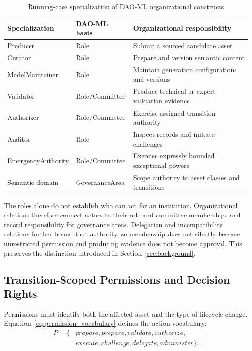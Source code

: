 \documentclass[journal]{IEEEtran}
\begin{document}
\begin{table}[t]
\caption{Running-case specialization of DAO-ML organizational
constructs}
\label{tab:governance_roles}
\centering
\begin{tabular}{p{2.1cm}p{1.8cm}p{3.4cm}}
\hline
Specialization & DAO-ML basis & Organizational responsibility\\
\hline
Producer & Role & Submit a sourced candidate asset\\
Curator & Role & Prepare and version semantic content\\
Model\allowbreak Maintainer & Role &
Maintain generation configurations and versions\\
Validator & Role/\allowbreak Committee &
Produce technical or expert validation evidence\\
Authorizer & Role/\allowbreak Committee &
Exercise assigned transition authority\\
Auditor & Role & Inspect records and initiate challenges\\
Emergency\allowbreak Authority & Role/\allowbreak Committee &
Exercise expressly bounded exceptional powers\\
Semantic domain & Governance\allowbreak Area &
Scope authority to asset classes and transitions\\
\hline
\end{tabular}
\end{table}

The roles alone do not establish who can act for an institution.
Organizational relations therefore connect actors to their role and
committee memberships and record responsibility for governance areas.
Delegation and incompatibility relations further bound that authority,
so membership does not silently become unrestricted permission and
producing evidence does not become approval. This preserves the
distinction introduced in Section~\ref{sec:background}.

\subsection{Transition-Scoped Permissions and Decision Rights}
\label{sec:decision_rights}

Permissions must identify both the affected asset and the
type of lifecycle change. Equation~\ref{eq:permission_vocabulary}
defines the action vocabulary:
\begin{equation}
\label{eq:permission_vocabulary}
\begin{aligned}
P=\{&\mathit{propose},\mathit{prepare},\mathit{validate},
\mathit{authorize},\\
&\mathit{execute},\mathit{challenge},\mathit{delegate},
\mathit{administer}\}.
\end{aligned}
\end{equation}
\end{document}
